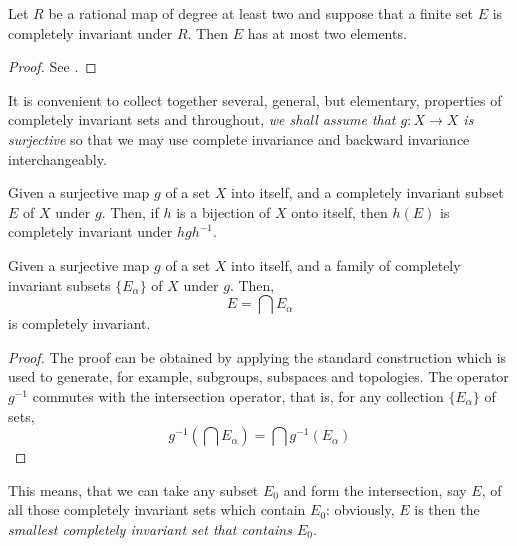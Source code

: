 \begin{theorem}
    \label{thm:completely_invariant_implies_non_empty_non_singleton}
    Let $R$ be a rational map of degree at least two and suppose that a finite
    set $E$ is completely invariant under $R$. Then $E$ has at most two
    elements.
\end{theorem}
\begin{proof}
    See \cite[52]{Beardon1991}.
\end{proof}

It is convenient to collect together several, general, but elementary,
properties of completely invariant sets and throughout, \emph{we shall assume
that $g: X \to X$ is surjective} so that we may use complete invariance and
backward invariance interchangeably.

\begin{proposition}
    Given a surjective map $g$ of a set $X$ into itself, and a completely
    invariant subset $E$ of $X$ under $g$. Then, if $h$ is a bijection of $X$
    onto itself, then $h(E)$ is completely invariant under $h g h^{-1}$.
\end{proposition}

\begin{proposition}
    Given a surjective map $g$ of a set $X$ into itself, and a family of
    completely invariant subsets $\{E_\alpha\}$ of $X$ under $g$. Then,
    \begin{equation*}
        E = \bigcap E_\alpha
    \end{equation*}
    is completely invariant.
\end{proposition}
\begin{proof}
    The proof can be obtained by applying the standard construction which is
    used to generate, for example, subgroups, subspaces and topologies. The
    operator $g^{-1}$ commutes with the intersection operator, that is, for any
    collection $\{E_\alpha\}$ of sets,
    \begin{equation*}
        g^{-1}\left(\bigcap E_\alpha \right) = \bigcap g^{-1}(E_\alpha)
    \end{equation*}
\end{proof}

This means, that we can take any subset $E_0$ and form the intersection, say
$E$, of all those completely invariant sets which contain $E_0$: obviously, $E$
is then the \emph{smallest completely invariant set that contains $E_0$}.

